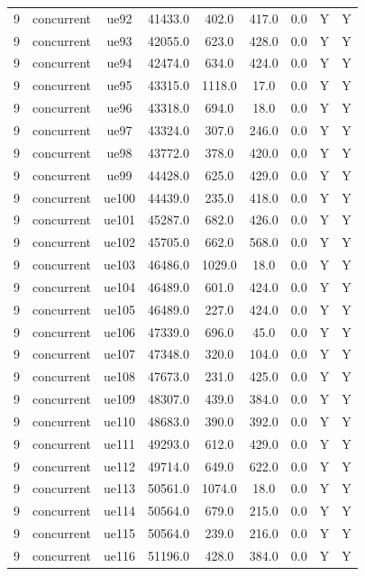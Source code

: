 \begin{table}[ht]
\begin{tabular}{|c|c|c|c|c|c|c|c|c|}
9 & concurrent & ue92 & 41433.0 & 402.0 & 417.0 & 0.0 & Y & Y \\
9 & concurrent & ue93 & 42055.0 & 623.0 & 428.0 & 0.0 & Y & Y \\
9 & concurrent & ue94 & 42474.0 & 634.0 & 424.0 & 0.0 & Y & Y \\
9 & concurrent & ue95 & 43315.0 & 1118.0 & 17.0 & 0.0 & Y & Y \\
9 & concurrent & ue96 & 43318.0 & 694.0 & 18.0 & 0.0 & Y & Y \\
9 & concurrent & ue97 & 43324.0 & 307.0 & 246.0 & 0.0 & Y & Y \\
9 & concurrent & ue98 & 43772.0 & 378.0 & 420.0 & 0.0 & Y & Y \\
9 & concurrent & ue99 & 44428.0 & 625.0 & 429.0 & 0.0 & Y & Y \\
9 & concurrent & ue100 & 44439.0 & 235.0 & 418.0 & 0.0 & Y & Y \\
9 & concurrent & ue101 & 45287.0 & 682.0 & 426.0 & 0.0 & Y & Y \\
9 & concurrent & ue102 & 45705.0 & 662.0 & 568.0 & 0.0 & Y & Y \\
9 & concurrent & ue103 & 46486.0 & 1029.0 & 18.0 & 0.0 & Y & Y \\
9 & concurrent & ue104 & 46489.0 & 601.0 & 424.0 & 0.0 & Y & Y \\
9 & concurrent & ue105 & 46489.0 & 227.0 & 424.0 & 0.0 & Y & Y \\
9 & concurrent & ue106 & 47339.0 & 696.0 & 45.0 & 0.0 & Y & Y \\
9 & concurrent & ue107 & 47348.0 & 320.0 & 104.0 & 0.0 & Y & Y \\
9 & concurrent & ue108 & 47673.0 & 231.0 & 425.0 & 0.0 & Y & Y \\
9 & concurrent & ue109 & 48307.0 & 439.0 & 384.0 & 0.0 & Y & Y \\
9 & concurrent & ue110 & 48683.0 & 390.0 & 392.0 & 0.0 & Y & Y \\
9 & concurrent & ue111 & 49293.0 & 612.0 & 429.0 & 0.0 & Y & Y \\
9 & concurrent & ue112 & 49714.0 & 649.0 & 622.0 & 0.0 & Y & Y \\
9 & concurrent & ue113 & 50561.0 & 1074.0 & 18.0 & 0.0 & Y & Y \\
9 & concurrent & ue114 & 50564.0 & 679.0 & 215.0 & 0.0 & Y & Y \\
9 & concurrent & ue115 & 50564.0 & 239.0 & 216.0 & 0.0 & Y & Y \\
9 & concurrent & ue116 & 51196.0 & 428.0 & 384.0 & 0.0 & Y & Y \\

\end{tabular}
\end{table}
